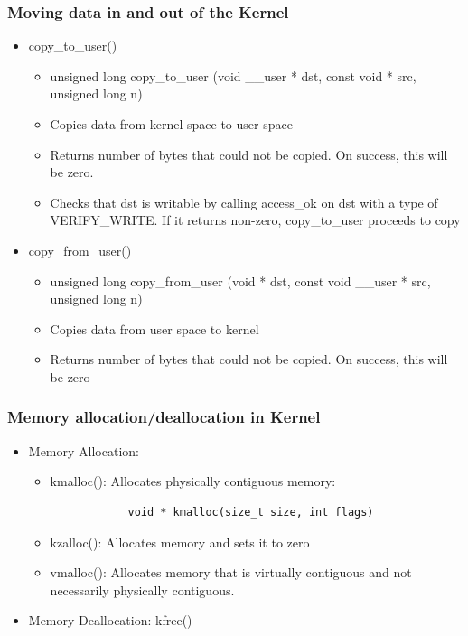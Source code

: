 \documentclass[12pt]{article}
\begin{document}
\subsubsection{Moving data in and out of the Kernel}
\begin{itemize}
    \item copy\_to\_user() \begin{itemize}
        \item unsigned long copy\_to\_user (void \_\_user * dst, const void * src, unsigned long n)
        \item Copies data from kernel space to user space
        \item Returns number of bytes that could not be copied. On success, this will be zero.
        \item Checks that dst is writable by calling access\_ok on dst with a type of VERIFY\_WRITE. If it returns non-zero, copy\_to\_user proceeds to copy
    \end{itemize}
    \item copy\_from\_user() \begin{itemize}
        \item unsigned long copy\_from\_user (void * dst, const void \_\_user * src, unsigned long n)
        \item Copies data from user space to kernel
        \item Returns number of bytes that could not be copied. On success, this will be zero
    \end{itemize}
\end{itemize}
\subsubsection{Memory allocation/deallocation in Kernel}
\begin{itemize}
    \item Memory Allocation: \begin{itemize}
        \item kmalloc(): Allocates physically contiguous memory: \begin{lstlisting}
            void * kmalloc(size_t size, int flags)
        \end{lstlisting}
        \item kzalloc(): Allocates memory and sets it to zero
        \item vmalloc(): Allocates memory that is virtually contiguous and not necessarily physically contiguous.
    \end{itemize}
    \item Memory Deallocation: kfree()
\end{itemize}
\end{document}
